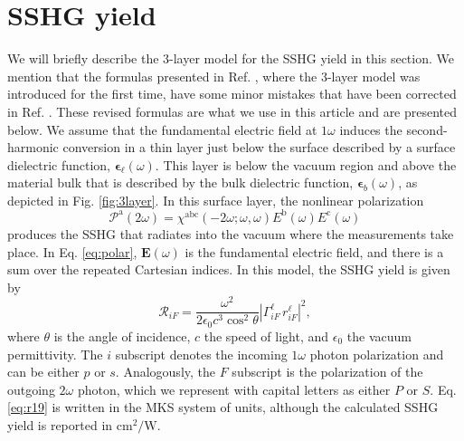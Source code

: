 \documentclass[prb,superscriptaddress,showpacs,twocolumn,letterpaper]{revtex4}
\begin{document}
\section{SSHG yield}\label{sec:yield}

We will briefly describe the 3-layer model for the SSHG yield in
this section. We mention that the formulas presented in Ref.
, where the 3-layer model was introduced for
the first time, have some minor mistakes that have been corrected in Ref.
. These revised formulas are what we use in this
article and are presented below. We assume that the fundamental electric field
at $1\omega$ induces the second-harmonic conversion in a thin layer just below
the surface described by a surface dielectric function,
$\boldsymbol{\epsilon}_{\ell}(\omega)$. This layer is below the vacuum region
and above the material bulk that is described by the bulk dielectric function,
$\boldsymbol{\epsilon}_b(\omega)$, as depicted in Fig.
\ref{fig:3layer}. In this surface layer, the nonlinear polarization
\begin{equation}\label{eq:polar}
\mathcal{P}^{\mathrm{a}}(2\omega) = 
\chi^{\mathrm{abc}}(-2\omega;\omega,\omega)
E^{\mathrm{b}}(\omega)E^{\mathrm{c}}(\omega)
\end{equation}
produces the SSHG that radiates into the vacuum where the measurements take
place. In Eq. \eqref{eq:polar}, $\mathbf{E}(\omega)$ is the fundamental electric
field, and there is a sum over the repeated Cartesian indices. In this model,
the SSHG yield is given by\cite{andersonARXIV16}
\begin{equation}\label{eq:r19}
\mathcal{R}_{iF}=
\frac{\omega^{2}}{2\epsilon_{0}c^{3}\cos^{2}\theta}
\left|\Gamma^{\ell}_{iF}\,r^{\ell}_{iF}\right|^2,
\end{equation}
where $\theta$ is the angle of incidence, $c$ the speed of light, and
$\epsilon_{0}$ the vacuum permittivity. The $i$ subscript denotes the incoming
$1\omega$ photon polarization and can be either $p$ or $s$. Analogously, the $F$
subscript is the polarization of the outgoing $2\omega$ photon, which we
represent with capital letters as either $P$ or $S$. Eq. \eqref{eq:r19} is
written in the MKS system of units, although the calculated SSHG yield is
reported in $\text{cm}^{2}/\text{W}$.
\end{document}
